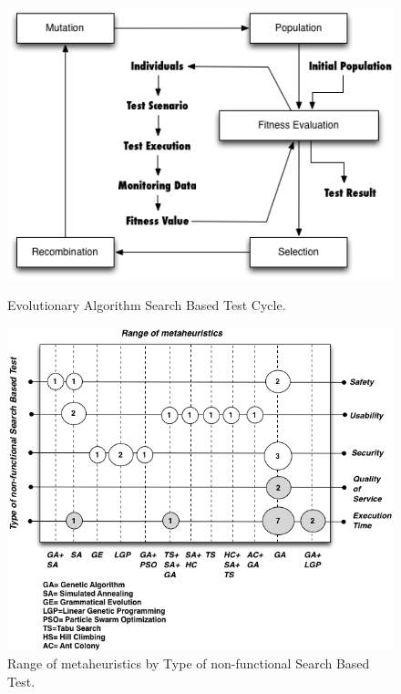 \begin{figure}[h]
\begin{minipage}{.5\textwidth}
\centering
\includegraphics[width=1\textwidth]{./images/evolutionary.png}
\caption{Evolutionary Algorithm Search Based Test Cycle\cite{Baars2011}. }
\label{fig:evocycle}
\end{minipage}
\begin{minipage}{.5\textwidth}
\centering
\includegraphics[width=1\textwidth]{./images/metaheuristics.png}
\caption{Range of metaheuristics by Type of non-functional Search Based Test\cite{Afzal2009a}. }
\label{fig:metabykind}
\end{minipage}
\end{figure}



